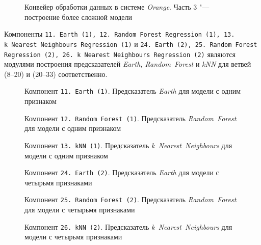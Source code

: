 \begin{figure}[tbp]
    \caption{Конвейер обработки данных в системе \textit{Orange}. Часть 3 "--- построение более сложной модели}
    \label{img:series30-4}
\end{figure}

Компоненты \texttt{11.\,Earth~(1), 12.\,Random~Forest Regression~(1), 13.\,k~Nearest~Neighbours Regression~(1)} и \texttt{24.\,Earth~(2), 25.~Random~Forest Regression~(2), 26.\,k~Nearest~Neighbours Regression~(2)} являются модулями построения предсказателей \textit{Earth, Random~Forest} и \textit{kNN} для ветвей (8--20) и (20--33) соответственно.

\begin{figure}[tbp]
    \caption{Компонент \texttt{11.\,Earth~(1)}. Предсказатель \textit{Earth} для модели с одним признаком}
    \label{img:11-Earth-1}
\end{figure}

\begin{figure}[tbp]
    \center{\texttt{[image: 12-RF-1]}}
    \caption{Компонент \texttt{12.\,Random~Forest~(1)}. Предсказатель \textit{Random~Forest} для модели с одним признаком}
    \label{img:12-RF-1}
\end{figure}

\begin{figure}[tbp]
    \caption{Компонент \texttt{13.\,kNN~(1)}. Предсказатель \textit{k~Nearest~Neighbours} для модели с одним признаком}
    \label{img:13-kNN-1}
\end{figure}

\begin{figure}[tbp]
    \caption{Компонент \texttt{24.\,Earth~(2)}. Предсказатель \textit{Earth} для модели с четырьмя признаками}
    \label{img:24-Earth-2}
\end{figure}

\begin{figure}[tbp]
    \center{\texttt{[image: 25-RF-2]}}
    \caption{Компонент \texttt{25.\,Random~Forest~(2)}. Предсказатель \textit{Random~Forest} для модели с четырьмя признаками}
    \label{img:25-RF-2}
\end{figure}

\begin{figure}[tbp]
    \caption{Компонент \texttt{26.\,kNN~(2)}. Предсказатель \textit{k~Nearest~Neighbours} для модели с четырьмя признаками}
    \label{img:26-kNN-2}
\end{figure}

